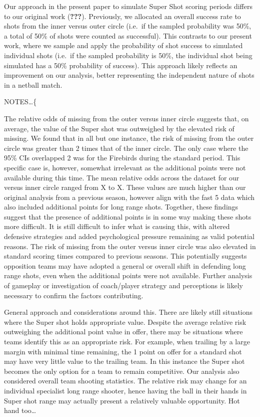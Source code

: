 \documentclass[]{elsarticle} %
\begin{document}
Our approach in the present paper to simulate Super Shot scoring periods
differs to our original work ({\textbf{???}}). Previously, we allocated
an overall success rate to shots from the inner versus outer circle
(i.e.~if the sampled probability was 50\%, a total of 50\% of shots were
counted as successful). This contrasts to our present work, where we
sample and apply the probability of shot success to simulated individual
shots (i.e.~if the sampled probability is 50\%, the individual shot
being simulated has a 50\% probability of success). This approach likely
reflects an improvement on our analysis, better representing the
independent nature of shots in a netball match.

NOTES\ldots\{

The relative odds of missing from the outer versus inner circle suggests
that, on average, the value of the Super shot was outweighed by the
elevated risk of missing. We found that in all but one instance, the
risk of missing from the outer circle was greater than 2 times that of
the inner circle. The only case where the 95\% CIs overlapped 2 was for
the Firebirds during the standard period. This specific case is,
however, somewhat irrelevant as the additional points were not available
during this time. The mean relative odds across the dataset for our
versus inner circle ranged from X to X. These values are much higher
than our original analysis from a previous season, however align with
the fast 5 data which also included additional points for long range
shots. Together, these findings suggest that the presence of additional
points is in some way making these shots more difficult. It is still
difficult to infer what is causing this, with altered defensive
strategies and added psychological pressure remaining as valid potential
reasons. The risk of missing from the outer versus inner circle was also
elevated in standard scoring times compared to previous seasons. This
potentially suggests opposition teams may have adopted a general or
overall shift in defending long range shots, even when the additional
points were not available. Further analysis of gameplay or investigation
of coach/player strategy and perceptions is likely necessary to confirm
the factors contributing.

General approach and considerations around this. There are likely still
situations where the Super shot holds appropriate value. Despite the
average relative risk outweighing the additional point value in offer,
there may be situations where teams identify this as an appropriate
risk. For example, when trailing by a large margin with minimal time
remaining, the 1 point on offer for a standard shot may have very little
value to the trailing team. In this instance the Super shot becomes the
only option for a team to remain competitive. Our analysis also
considered overall team shooting statistics. The relative risk may
change for an individual specialist long range shooter, hence having the
ball in their hands in Super shot range may actually present a
relatively valuable opportunity. Hot hand too\ldots{}
\end{document}
